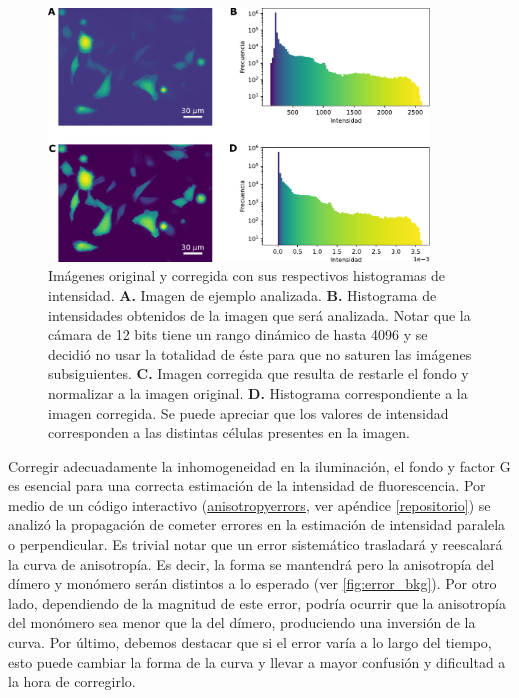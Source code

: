 \begin{figure}[htb]
    \centering
    \includegraphics[width=0.9\textwidth]{img/cap_2/correcteds.pdf}
    \caption{\footnotesize{Imágenes original y corregida con sus respectivos histogramas de intensidad. \textbf{A.} Imagen de ejemplo analizada. \textbf{B.} Histograma de intensidades obtenidos de la imagen que será analizada. Notar que la cámara de 12 bits tiene un rango dinámico de hasta 4096 y se decidió no usar la totalidad de éste para que no saturen las imágenes subsiguientes. \textbf{C.} Imagen corregida que resulta de restarle el fondo y normalizar a la imagen original. \textbf{D.} Histograma correspondiente a la imagen corregida. Se puede apreciar que los valores de intensidad corresponden a las distintas células presentes en la imagen.}}
    \label{fig:correcteds}
\end{figure}

Corregir adecuadamente la inhomogeneidad en la iluminación, el fondo y factor G es esencial para una correcta estimación de la intensidad de fluorescencia. Por medio de un código interactivo (\href{https://github.com/acorbat/anisotropy_errors/tree/master/anisotropy_errors}{anisotropy\textunderscore errors}, ver apéndice \ref{repositorio}) se analizó la propagación de cometer errores en la estimación de intensidad paralela o perpendicular. Es trivial notar que un error sistemático trasladará y reescalará la curva de anisotropía. Es decir, la forma se mantendrá pero la anisotropía del dímero y monómero serán distintos a lo esperado (ver \cref{fig:error_bkg}). Por otro lado, dependiendo de la magnitud de este error, podría ocurrir que la anisotropía del monómero sea menor que la del dímero, produciendo una inversión de la curva. Por último, debemos destacar que si el error varía a lo largo del tiempo, esto puede cambiar la forma de la curva y llevar a mayor confusión y dificultad a la hora de corregirlo.

